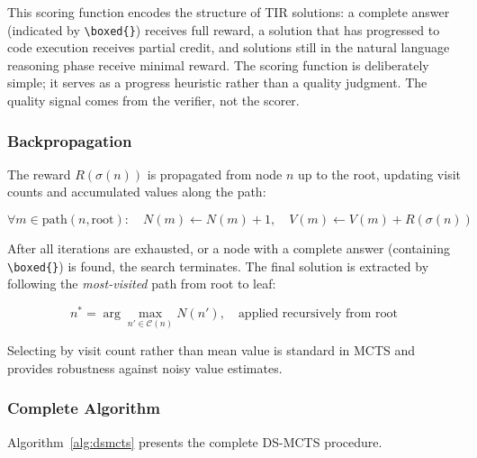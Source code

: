 \documentclass[11pt,a4paper]{article}
\begin{document}
This scoring function encodes the structure of TIR solutions: a complete
answer (indicated by \verb|\boxed{}|) receives full reward, a solution that has
progressed to code execution receives partial credit, and solutions still in the
natural language reasoning phase receive minimal reward. The scoring function
is deliberately simple; it serves as a progress heuristic rather than a quality
judgment. The quality signal comes from the verifier, not the scorer.

\subsubsection{Backpropagation}

The reward $R(\sigma(n))$ is propagated from node $n$ up to the root, updating
visit counts and accumulated values along the path:

\begin{equation}
\forall m \in \text{path}(n, \text{root}): \quad N(m) \leftarrow N(m) + 1, \quad V(m) \leftarrow V(m) + R(\sigma(n))
\end{equation}

After all iterations are exhausted, or a node with a complete answer (containing
\verb|\boxed{}|) is found, the search terminates. The final solution is
extracted by following the \emph{most-visited} path from root to leaf:

\begin{equation}
n^* = \arg\max_{n' \in \mathcal{C}(n)} N(n'), \quad \text{applied recursively from root}
\end{equation}

Selecting by visit count rather than mean value is standard in MCTS
\citep{silver2017mastering} and provides robustness against noisy value
estimates.

\subsubsection{Complete Algorithm}

Algorithm~\ref{alg:dsmcts} presents the complete DS-MCTS procedure.
\end{document}
